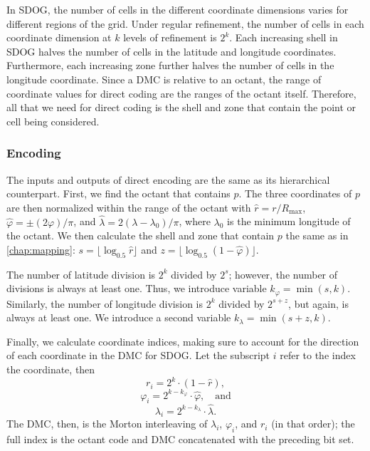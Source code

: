 In SDOG, the number of cells in the different coordinate dimensions varies for different regions of the grid.
Under regular refinement, the number of cells in each coordinate dimension at $k$ levels of refinement is $2^k$.
Each increasing shell in SDOG halves the number of cells in the latitude and longitude coordinates.
Furthermore, each increasing zone further halves the number of cells in the longitude coordinate.
Since a DMC is relative to an octant, the range of coordinate values for direct coding are the ranges of the octant itself.
Therefore, all that we need for direct coding is the shell and zone that contain the point or cell being considered.


\subsubsection{Encoding}
The inputs and outputs of direct encoding are the same as its hierarchical counterpart.
First, we find the octant that contains $p$.
The three coordinates of $p$ are then normalized within the range of the octant with $\hat{r} = r / R_\mathrm{max}$, $\hat{\varphi} = \pm (2\varphi) / \pi$, and $\hat{\lambda} = 2 (\lambda - \lambda_0) / \pi$, where $\lambda_0$ is the minimum longitude of the octant.
We then calculate the shell and zone that contain $p$ the same as in \cref{chap:mapping}: $s = \lfloor \log_{0.5} \hat{r} \rfloor$ and $z = \lfloor \log_{0.5} ( 1 - \hat{\varphi} ) \rfloor$.


The number of latitude division is $2^k$ divided by $2^s$; however, the number of divisions is always at least one.
Thus, we introduce variable $k_\varphi = \min ( s, k )$.
Similarly, the number of longitude division is $2^k$ divided by $2^{s+z}$, but again, is always at least one.
We introduce a second variable $k_\lambda = \min ( s + z, k )$.


Finally, we calculate coordinate indices, making sure to account for the direction of each coordinate in the DMC for SDOG.
Let the subscript $i$ refer to the index the coordinate, then
%
\begin{equation*}
r_i = 2^k \cdot ( 1 - \hat{r} ),
\end{equation*}
%
\begin{equation*}
\varphi_i = 2^{k - k_\varphi} \cdot \hat{\varphi}, \quad \text{and}
\end{equation*}
%
\begin{equation*}
\lambda_i = 2^{k - k_\lambda} \cdot \hat{\lambda}.
\end{equation*}
%
The DMC, then, is the Morton interleaving of $\lambda_i$, $\varphi_i$, and $r_i$ (in that order); the full index is the octant code and DMC concatenated with the preceding bit set.


